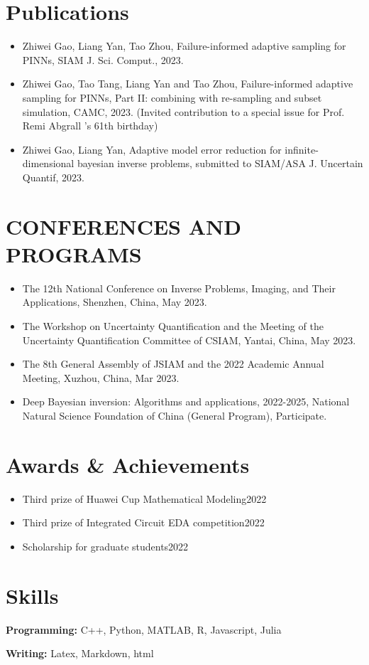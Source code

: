 \documentclass[letterpaper,11pt]{article}
\newcommand{\resumeItem}[1]{
  \item\small{
    {#1 \vspace{-2pt}}
  }
}
\newcommand{\resumeSubHeadingListStart}{\begin{itemize}[leftmargin=0.15in, label={}]}
\newcommand{\resumeSubHeadingListEnd}{\end{itemize}}
\newcommand{\resumeItemListStart}{\begin{itemize}}
\newcommand{\resumeItemListEnd}{\end{itemize}\vspace{-5pt}}
\begin{document}
\section{Publications}
    \vspace{3pt}
          \resumeItemListStart
            \resumeItem{Zhiwei Gao, Liang Yan, Tao Zhou, Failure-informed adaptive sampling for PINNs, SIAM J. Sci. Comput., 2023.}
            \resumeItem{ Zhiwei Gao, Tao Tang, Liang Yan and Tao Zhou,  Failure-informed adaptive sampling for PINNs, Part II: combining with re-sampling and subset simulation, CAMC, 2023.  (Invited contribution to a special issue for Prof. Remi Abgrall 's 61th birthday)}
            \resumeItem{Zhiwei Gao, Liang Yan, Adaptive model error reduction for infinite-dimensional bayesian inverse problems, submitted to SIAM/ASA J. Uncertain Quantif, 2023.}
          \resumeItemListEnd
      
\section{CONFERENCES AND PROGRAMS}
\vspace{3pt}
\resumeItemListStart
\resumeItem{The 12th National Conference on Inverse Problems, Imaging, and Their Applications, Shenzhen, China, May 2023.}
\resumeItem{The Workshop on Uncertainty Quantification and the Meeting of the Uncertainty Quantification Committee of CSIAM, Yantai, China, May 2023.}
\resumeItem{The 8th General Assembly of JSIAM and the 2022 Academic Annual Meeting, Xuzhou, China, Mar 2023.}
\resumeItem{Deep Bayesian inversion: Algorithms and applications, 2022-2025, National Natural Science Foundation of China (General Program), Participate.}
\resumeItemListEnd 

\section{Awards \& Achievements}
  \vspace{2pt}
  \begin{itemize}
    \item Third prize of Huawei Cup Mathematical Modeling\hfill 2022
    \item Third prize of Integrated Circuit EDA competition\hfill 2022
    \item Scholarship for graduate students\hfill 2022
  \end{itemize}
    
\section{Skills}
  \vspace{2pt}
  \resumeSubHeadingListStart
    \small{\item{
        \textbf{Programming:}{ C++, Python, MATLAB, R, Javascript, Julia} \\ \vspace{3pt}
        
        \textbf{Writing: }{Latex, Markdown, html} \\ \vspace{3pt}
        
    }}
  \resumeSubHeadingListEnd
\end{document}
